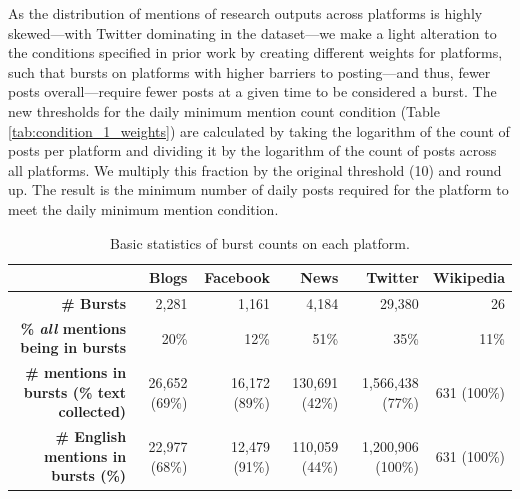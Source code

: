 \documentclass[letterpaper]{article} %
\begin{document}
As the distribution of mentions of research outputs across platforms is highly skewed---with Twitter dominating in the dataset---we make a light alteration to the conditions specified in prior work \citep{chengCascadesRecur2016} by creating different weights for platforms, such that bursts on platforms with higher barriers to posting---and thus, fewer posts overall---require fewer posts at a given time to be considered a burst. %
The new thresholds for the daily minimum mention count condition (Table \ref{tab:condition_1_weights}) are calculated by taking the logarithm of the count of posts per platform and dividing it by the logarithm of the count of posts across all platforms. We multiply this fraction by the original threshold (10) and round up. The result is the minimum number of daily posts required for the platform to meet the daily minimum mention condition.


\begin{table}[t]
    \centering
    \begin{tabular}{@{}r|r r r r r @{}}
    & \textbf{Blogs} & \textbf{Facebook} & \textbf{News} & \textbf{Twitter} & \textbf{Wikipedia} \\
    \hline
    \textbf{\# Bursts} & 2,281 & 1,161 & 4,184 & 29,380 & 26 \\
    \textbf{\% \textit{all} mentions being in bursts} & 20\% & 12\% & 51\% & 35\% & 11\% \\
    \textbf{\# mentions in bursts (\% text collected)} & 26,652 (69\%) & 16,172 (89\%) & 130,691 (42\%) & 1,566,438 (77\%) & 631 (100\%) \\
    \textbf{\# English mentions in bursts (\%)} & 22,977 (68\%) & 12,479 (91\%) & 110,059 (44\%) & 1,200,906 (100\%) & 631 (100\%)\\
    \end{tabular}
    \caption{Basic statistics of burst counts on each platform.}
    \label{tab:burst_post_counts}
\end{table}
\end{document}
